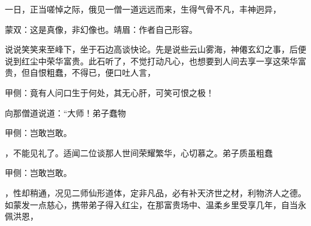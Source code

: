 \begin{parag}
    一日，正当嗟悼之际，俄见一僧一道远远而来，生得气骨不凡，丰神迥异，\begin{note}蒙双：这是真像，非幻像也。靖眉：作者自己形容。\end{note}说说笑笑来至峰下，坐于石边高谈快论。先是说些云山雾海，神僊玄幻之事，后便说到红尘中荣华富贵。此石听了，不觉打动凡心，也想要到人间去享一享这荣华富贵，但自恨粗蠢，不得已，便口吐人言，\begin{note}甲侧：竟有人问口生于何处，其无心肝，可笑可恨之极！\end{note}向那僧道说道：“大师！弟子蠢物\begin{note}甲侧：岂敢岂敢。\end{note}，不能见礼了。适闻二位谈那人世间荣耀繁华，心切慕之。弟子质虽粗蠢\begin{note}甲侧：岂敢岂敢。\end{note}，性却稍通，况见二师仙形道体，定非凡品，必有补天济世之材，利物济人之德。如蒙发一点慈心，携带弟子得入红尘，在那富贵场中、温柔乡里受享几年，自当永佩洪恩，
\end{parag}
